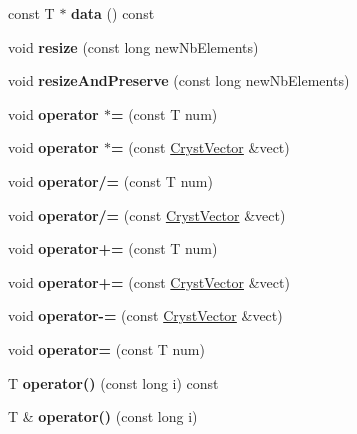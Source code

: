 \begin{DoxyCompactItemize}
const T $\ast$ {\bfseries data} () const
\item 
\mbox{\label{class_cryst_vector_ab1765dd06bec2086b6f51540f023cd09}} 
void {\bfseries resize} (const long new\+Nb\+Elements)
\item 
\mbox{\label{class_cryst_vector_a9270bfb8548cde6f525906919058c816}} 
void {\bfseries resize\+And\+Preserve} (const long new\+Nb\+Elements)
\item 
\mbox{\label{class_cryst_vector_aa81091f6140b4f668321f580c308a222}} 
void {\bfseries operator $\ast$=} (const T num)
\item 
\mbox{\label{class_cryst_vector_ad63d48db069e0a609edc312c9a3ad14d}} 
void {\bfseries operator $\ast$=} (const \mbox{\hyperlink{class_cryst_vector}{Cryst\+Vector}} \&vect)
\item 
\mbox{\label{class_cryst_vector_a40b9ab22eae2b5503315ba8df2eb66b7}} 
void {\bfseries operator/=} (const T num)
\item 
\mbox{\label{class_cryst_vector_a1d03e858d034cdcdc5017c935f2abf21}} 
void {\bfseries operator/=} (const \mbox{\hyperlink{class_cryst_vector}{Cryst\+Vector}} \&vect)
\item 
\mbox{\label{class_cryst_vector_a555db5dc4586f16776a7c7f85ab1c55a}} 
void {\bfseries operator+=} (const T num)
\item 
\mbox{\label{class_cryst_vector_a48d593976114ca7a7324c32777f6609d}} 
void {\bfseries operator+=} (const \mbox{\hyperlink{class_cryst_vector}{Cryst\+Vector}} \&vect)
\item 
\mbox{\label{class_cryst_vector_a7e0b418e32820b39046aa6b24f29ebc3}} 
void {\bfseries operator-\/=} (const \mbox{\hyperlink{class_cryst_vector}{Cryst\+Vector}} \&vect)
\item 
\mbox{\label{class_cryst_vector_ab0ccd3c73e6306422842b3f25d475025}} 
void {\bfseries operator=} (const T num)
\item 
\mbox{\label{class_cryst_vector_a930858e0299ff347602370c095fa8295}} 
T {\bfseries operator()} (const long i) const
\item 
\mbox{\label{class_cryst_vector_a298542b4d39d57db8af50c0975c77790}} 
T \& {\bfseries operator()} (const long i)
\end{DoxyCompactItemize}


